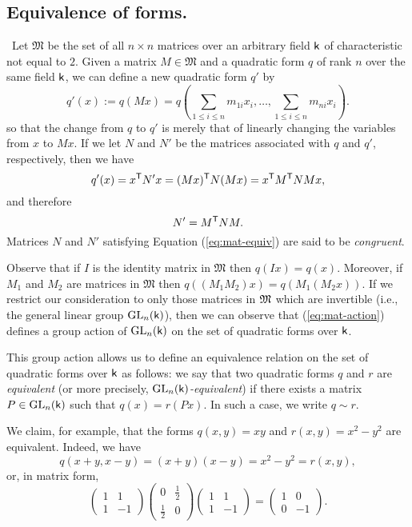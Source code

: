 \subsection{Equivalence of forms.}\label{sec:mat-equiv}~Let \(\mathfrak{M}\) be the set of all \(n \times n\) matrices over an arbitrary field \(\mathsf{k}\) of characteristic not equal to \(2\). Given a matrix \(M \in \mathfrak{M}\) and a quadratic form \(q\) of rank \(n\) over the same field \(\mathsf{k}\), we can define a new quadratic form \(q'\) by
\begin{equation}\label{eq:mat-action}
  q'(x) := q(Mx) = q\left(\sum_{1 \leq i \leq n} m_{1i}x_i, \dots, \sum_{1 \leq i \leq n} m_{ni}x_i\right).
\end{equation}
so that the change from \(q\) to \(q'\) is merely that of linearly changing the variables from \(x\) to \(Mx\). If we let \(N\) and \(N'\) be the matrices associated with \(q\) and \(q'\), respectively, then we have
\[
  q'(x) = x^{\mathsf{T}}N'x = (Mx)^{\mathsf{T}}N(Mx) = x^{\mathsf{T}} M^{\mathsf{T}}NMx,
\]
and therefore
\begin{equation}\label{eq:mat-equiv}
  N' = M^{\mathsf{T}}NM.
\end{equation}
Matrices \(N\) and \(N'\) satisfying Equation (\ref{eq:mat-equiv}) are said to be \emph{congruent}.

Observe that if \(I\) is the identity matrix in \(\mathfrak{M}\) then \(q(Ix) = q(x)\). Moreover, if \(M_1\) and \(M_2\) are matrices in \(\mathfrak{M}\) then \(q((M_1M_2)x) = q(M_1(M_2x))\). If we restrict our consideration to only those matrices in \(\frak{M}\) which are invertible (i.e., the general linear group \(\mathrm{GL}_{n}(\mathsf{k})\)), then we can observe that (\ref{eq:mat-action}) defines a group action of \(\mathrm{GL}_{n}(\mathsf{k})\) on the set of quadratic forms over \(\mathsf{k}\).

This group action allows us to define an equivalence relation \cite[p.~89]{hungerford2012algebra} on the set of quadratic forms over \(\mathsf{k}\) as follows: we say that two quadratic forms \(q\) and \(r\) are \emph{equivalent} (or more precisely, \emph{\(\mathrm{GL}_{n}(\mathsf{k})\)-equivalent}) if there exists a matrix \(P \in \mathrm{GL}_{n}(\mathsf{k})\) such that \(q(x) = r(Px)\). In such a case, we write \(q \sim r\).

We claim, for example, that the forms \(q(x, y) = xy\) and \(r(x, y) = x^2 - y^2\) are equivalent. Indeed, we have
\[
  q(x+y, x-y) = (x+y)(x-y) = x^2 - y^2 = r(x, y),
\]
or, in matrix form,
\[
  \begin{pmatrix}
    1 & 1 \\
    1 & -1
  \end{pmatrix}
  \begin{pmatrix}
    0 & \frac{1}{2} \\
    \frac{1}{2} & 0
  \end{pmatrix}
  \begin{pmatrix}
    1 & 1 \\
    1 & -1
  \end{pmatrix}
  =
  \begin{pmatrix}
    1 & 0 \\
    0 & -1
  \end{pmatrix}.
\]

